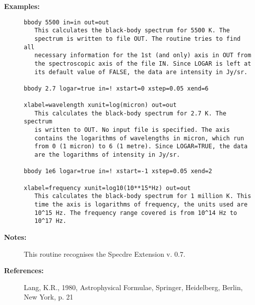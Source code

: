 \begin{description}
\item [{\bf Examples:}]
\begin{verbatim}
bbody 5500 in=in out=out
   This calculates the black-body spectrum for 5500 K. The
   spectrum is written to file OUT. The routine tries to find all
   necessary information for the 1st (and only) axis in OUT from
   the spectroscopic axis of the file IN. Since LOGAR is left at
   its default value of FALSE, the data are intensity in Jy/sr.

bbody 2.7 logar=true in=! xstart=0 xstep=0.05 xend=6

xlabel=wavelength xunit=log(micron) out=out
   This calculates the black-body spectrum for 2.7 K. The spectrum
   is written to OUT. No input file is specified. The axis
   contains the logarithms of wavelengths in micron, which run
   from 0 (1 micron) to 6 (1 metre). Since LOGAR=TRUE, the data
   are the logarithms of intensity in Jy/sr.

bbody 1e6 logar=true in=! xstart=-1 xstep=0.05 xend=2

xlabel=frequency xunit=log10(10**15*Hz) out=out
   This calculates the black-body spectrum for 1 million K. This
   time the axis is logarithms of frequency, the units used are
   10^15 Hz. The frequency range covered is from 10^14 Hz to
   10^17 Hz.
\end{verbatim}

\item [{\bf Notes:}]
This routine recognises the Specdre Extension v. 0.7.

\item [{\bf References:}]
   Lang, K.R., 1980, Astrophysical Formulae, Springer, Heidelberg,
   Berlin, New York, p. 21

\end{description}
